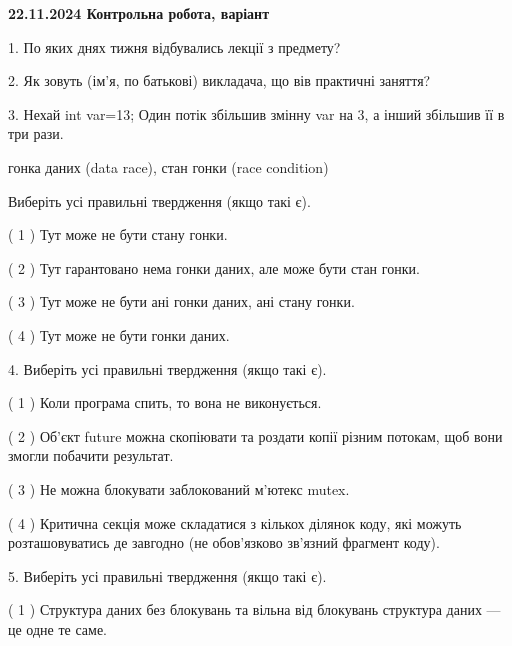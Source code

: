 \documentclass[12pt, ukrainian]{article}
\begin{document}
\vspace{4mm}
\newpage
\begin {large}

\textbf{22.11.2024 Контрольна робота, варіант  }\par


{
1. По яких днях тижня відбувались лекції з предмету?



\vspace{5mm}
2. Як зовуть (ім'я, по батькові) викладача, що вів практичні заняття?



\vspace{5mm}
3. Нехай int var=13; Один потік збільшив змінну var на 3, а інший збільшив її в три рази.

гонка даних (data race), стан гонки (race condition)

Виберіть усі правильні твердження (якщо такі є).\par
\vspace{2mm}
( 1 ) Тут може не бути стану гонки.%

( 2 ) Тут гарантовано нема гонки даних, але може бути стан гонки.%

( 3 ) Тут може не бути ані гонки даних, ані стану гонки.%

( 4 ) Тут може не бути гонки даних.%


\vspace{5mm}
4. Виберіть усі правильні твердження (якщо такі є).\par
\vspace{2mm}

( 1 ) Коли програма спить, то вона не виконується.%

( 2 ) Об’єкт future можна скопіювати та роздати копії різним потокам, щоб вони змогли побачити результат.%

( 3 ) Не можна блокувати заблокований м’ютекс mutex.%

( 4 ) Критична секція може складатися з кількох ділянок коду, які можуть розташовуватись де завгодно (не обов’язково зв’язний фрагмент коду).%


\vspace{5mm}
5. Виберіть усі правильні твердження (якщо такі є).\par
\vspace{2mm}

( 1 ) Структура даних без блокувань та вільна від блокувань структура даних --- це одне те саме.%

}
\end{large}
\end{document}
